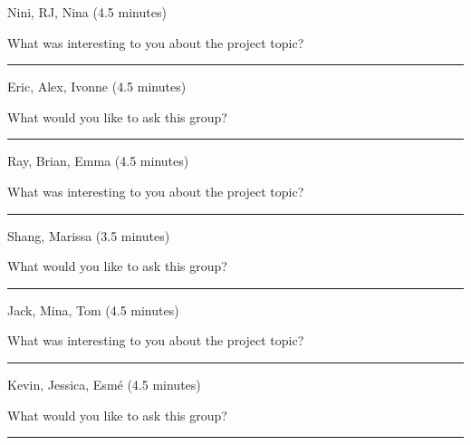 \documentclass[12pt,letterpaper,noanswers]{exam}
\begin{document}
 
 \noindent Nini, RJ, Nina (4.5 minutes)
 
   \noindent What was interesting to you about the project topic?


\vfill
 
 \hrule
 \vspace{0.1cm}

 
 \noindent Eric, Alex, Ivonne (4.5 minutes)
 
  \noindent What would you like to ask this group?
\vfill

 
    \hrule
  \vspace{0.1cm}

\noindent Ray, Brian, Emma (4.5 minutes)

   \noindent What was interesting to you about the project topic?


\vfill
 
 \hrule
  \vspace{0.1cm}
 

 \noindent Shang, Marissa (3.5 minutes)

  \noindent What would you like to ask this group?
\vfill 
 
 \hrule
  \vspace{0.1cm}

 
\noindent Jack, Mina, Tom (4.5 minutes)

   \noindent What was interesting to you about the project topic?


\vfill
 
 \hrule
  \vspace{0.1cm}


\noindent Kevin, Jessica, Esmé (4.5 minutes)

  \noindent What would you like to ask this group?

\vfill
 
 \hrule
  \vspace{0.1cm}
\end{document}

